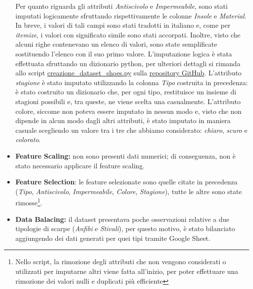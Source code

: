\documentclass[a4paper, 11pt, oneside]{report}
\begin{document}
\begin{itemize}
\begin{center}
                    \end{center}
                    Per quanto riguarda gli attributi  \emph{Antiscivolo} e \emph{Impermeabile}, sono stati imputati
                    logicamente sfruttando rispettivamente le colonne \emph{Insole} e \emph{Material}.
                    In breve, i valori di tali campi sono stati tradotti in italiano e, come per \emph{itemize}, i valori con significato simile sono stati
                    accorpati.
                    Inoltre, visto che alcuni righe contenevano un elenco di valori, sono state semplificate sostituendo l'elenco con il suo primo valore.
                    L'imputazione logica è stata effettuata sfruttando un dizionario python, per ulteriori dettagli si rimanda allo script
                    \href{https://github.com/frankzamma/NC22_WeatherStyle_classe03/blob/b8a2eb2de4f72fd37752e2c480e764e8797826f8/CreazioneDatasets/dataset_shoes/creazione_dataset_shoes.py}{creazione\_dataset\_shoes.py} sulla \href{https://github.com/frankzamma/NC22_WeatherStyle_classe03}{repository GitHub}.
                    L'attributo \emph{stagione} è stato imputato utilizzando la colonna \emph{Tipo} costruita in precedenza: è stato costruito un dizionario
                    che, per ogni tipo, restituisce un insieme di stagioni possibili e, tra queste, ne viene scelta una casualmente.
                    L'attributo colore, siccome non poteva essere imputato in nessun modo e, visto che non dipende in alcun modo dagli altri attributi,
                    è stato imputato in maniera casuale scegliendo un valore tra i tre che abbiamo considerato: \emph{chiaro}, \emph{scuro} e \emph{colorato}.
                    \item \textbf{Feature Scaling:} non sono presenti dati numerici; di conseguenza, non è stato necessario applicare il feature scaling.
                    \item \textbf{Feature Selection}: le feature selezionate sono quelle citate in precedenza (\emph{Tipo}, \emph{Antiscivolo}, \emph{Impermeabile}, \emph{Colore}, \emph{Stagione}),
                    tutte le altre sono state rimosse\footnote{Nello script, la rimozione degli attributi che non vengono
                    considerati o utilizzati per imputarne altri viene fatta all'inizio, per poter effettuare una rimozione dei valori nulli e duplicati più efficiente}.
                    \item \textbf{Data Balacing:} il dataset presentava poche osservazioni relative a due tipologie di scarpe (\emph{Anfibi} e \emph{Stivali}), per questo motivo, è stato bilanciato aggiungendo dei dati generati per quei tipi tramite Google Sheet.
                \end{itemize}
                \newpage
\end{document}
